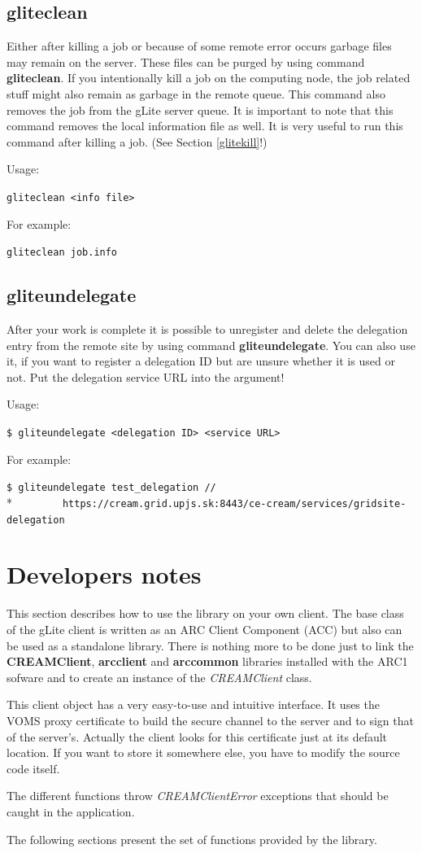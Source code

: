 \documentclass{article}
\begin{document}
\subsection{gliteclean}
\label{gliteclean}
Either after killing a job or because of some remote error occurs garbage files may remain on the server. These files can be purged by using command \textbf{gliteclean}. If you intentionally kill a job on the computing node, the job related stuff might also remain as garbage in the remote queue. This command also removes the job from the gLite server queue. It is important to note that this command removes the local information file as well. It is very useful to run this command after killing a job. (See Section \ref{glitekill}!)\par
Usage:
\begin{shaded}\verb#gliteclean <info file>#\end{shaded}
For example:
\begin{shaded}\verb#gliteclean job.info#\end{shaded}
\subsection{gliteundelegate}
\label{gliteundelegate}
After your work is complete it is possible to unregister and delete the delegation entry from the remote site by using command \textbf{gliteundelegate}. You can also use it, if you want to register a delegation ID but are unsure whether it is used or not. Put the delegation service URL into the argument!\par
Usage:
\begin{shaded}\verb#$ gliteundelegate <delegation ID> <service URL>#\end{shaded}
For example:
\begin{shaded}\verb#$ gliteundelegate test_delegation //#\\*
\verb#        https://cream.grid.upjs.sk:8443/ce-cream/services/gridsite-delegation#\end{shaded}
\section{Developers notes}
\label{Developers notes}
This section describes how to use the library on your own client. The base class of the gLite client is written as an ARC Client Component (ACC) but also can be used as a standalone library. There is nothing more to be done just to link the \textbf{CREAMClient}, \textbf{arcclient} and \textbf{arccommon} libraries installed with the ARC1 sofware and to create an instance of the \textit{CREAMClient} class.\par
This client object has a very easy-to-use and intuitive interface. It uses the VOMS proxy certificate to build the secure channel to the server and to sign that of the server's. Actually the client looks for this certificate just at its default location. If you want to store it somewhere else, you have to modify the source code itself.\par
The different functions throw \textit{CREAMClientError} exceptions that should be caught in the application.\par
The following sections present the set of functions provided by the library.
\end{document}
